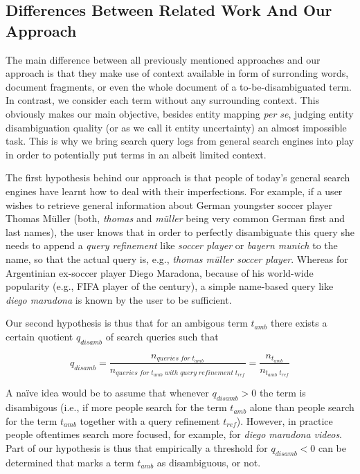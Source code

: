 \documentclass[twocolumn]{article}
\begin{document}
\subsection{Differences Between Related Work And Our Approach}

The main difference between all previously mentioned approaches and our approach is that they make use of context
available in form of surronding words, document fragments, or even the whole document of a to-be-disambiguated term. In
contrast, we consider each term without any surrounding context. This obviously makes our main objective, besides
entity mapping \textit{per se}, judging entity disambiguation quality (or as we call it entity uncertainty) an almost
impossible task. This is why we bring search query logs from general search engines into play in order to potentially
put terms in an albeit limited context.

The first hypothesis behind our approach is that people of today's general search engines have learnt how to deal with
their imperfections. For example, if a user wishes to retrieve general information about German youngster soccer player
Thomas M\"{u}ller (both, \textit{thomas} and \textit{m\"{u}ller} being very common German first and last names), the
user knows that in order to perfectly disambiguate this query she needs to append a \textit{query refinement} like
\textit{soccer player} or \textit{bayern munich} to the name, so that the actual query is, e.g.,  \textit{thomas
m\"{u}ller soccer player}. Whereas for Argentinian ex-soccer player Diego Maradona, because of his world-wide
popularity (e.g., FIFA player of the century), a simple name-based query like \textit{diego maradona} is known by the
user to be sufficient.

Our second hypothesis is thus that for an ambigous term $t_{amb}$ there exists a certain quotient $q_{disamb}$ of
search queries such that

$$ q_{disamb} = \frac{n_{queries\; for\; {t_{amb}}}}{n_{queries\; for\; t_{amb}\; with\; query\; refinement\; t_{ref}}}
= \frac{n_{t_{amb}}}{n_{{t_{amb}\; t_{ref}}}}$$

A na\"{i}ve idea would be to assume that whenever $q_{disamb} > 0$ the term is disambigous (i.e., if more people search
for the term $t_{amb}$ alone than people search for the term $t_{amb}$ together with a query refinement $t_{ref}$).
However, in practice people oftentimes search more focused, for example, for \textit{diego maradona videos}. Part of
our hypothesis is thus that empirically a threshold for $q_{disamb} < 0$ can be determined that marks a term $t_{amb}$
as disambiguous, or not.
\end{document}
